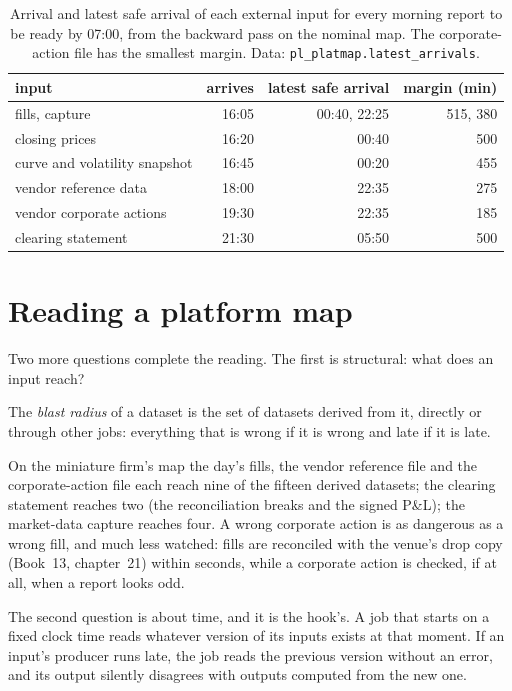 \begin{table}[ht]
\centering\small
\begin{tabular}{lrrr}
\toprule
input & arrives & latest safe arrival & margin (min) \\
\midrule
fills, capture & 16:05 & 00:40, 22:25 & 515, 380 \\
closing prices & 16:20 & 00:40 & 500 \\
curve and volatility snapshot & 16:45 & 00:20 & 455 \\
vendor reference data & 18:00 & 22:35 & 275 \\
vendor corporate actions & 19:30 & 22:35 & 185 \\
clearing statement & 21:30 & 05:50 & 500 \\
\bottomrule
\end{tabular}
\caption{Arrival and latest safe arrival of each external input for every morning report to be ready by 07:00, from the
backward pass on the nominal map. The corporate-action file has the smallest margin. Data: \texttt{pl\_platmap.latest\_arrivals}.}\label{tab:pl:the-platform-map:latest}
\end{table}

\section{Reading a platform map}

Two more questions complete the reading. The first is structural: what does an input reach?

\begin{definition}\label{def:pl:the-platform-map:blast}
The \emph{blast radius} of a dataset is the set of datasets derived from it, directly or through other
jobs: everything that is wrong if it is wrong and late if it is late.
\end{definition}

On the miniature firm's map the day's fills, the vendor
reference file and the corporate-action file each reach nine of the fifteen derived datasets; the clearing statement reaches
two (the reconciliation breaks and the signed P\&L); the market-data capture reaches four. A wrong corporate action is as
dangerous as a wrong fill, and much less watched: fills are reconciled with the venue's drop copy (Book~13, chapter~21) within
seconds, while a corporate action is checked, if at all, when a report looks odd.

The second question is about time, and it is the hook's. A job that starts on a fixed clock time reads whatever version of its
inputs exists at that moment. If an input's producer runs late, the job reads the previous version without an error, and its
output silently disagrees with outputs computed from the new one.

